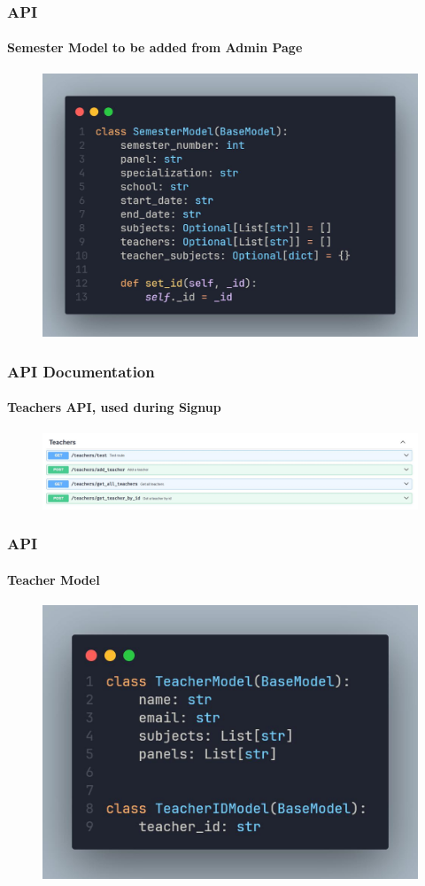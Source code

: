 \documentclass[aspectratio=169]{beamer}
\begin{document}
\begin{frame}
	\centering
	\frametitle{API}
	\framesubtitle{Semester Model to be added from Admin Page}
	\begin{minipage}{0.95\textwidth}
		\begin{figure}[H]
			\centering
			\includegraphics[width=.65\textwidth]{semester.jpg}
		\end{figure}
	\end{minipage}
\end{frame}

\begin{frame}
	\centering
	\frametitle{API Documentation}
	\framesubtitle{Teachers API, used during Signup}
	\begin{minipage}{0.95\textwidth}
		\begin{figure}[H]
			\centering
			\includegraphics[width=.95\textwidth]{swagger 7.jpg}
		\end{figure}
	\end{minipage}
\end{frame}


\begin{frame}
	\centering
	\frametitle{API}
	\framesubtitle{Teacher Model}
	\begin{minipage}{0.95\textwidth}
		\begin{figure}[H]
			\centering
			\includegraphics[width=.75\textwidth]{teacher.jpg}
		\end{figure}
	\end{minipage}
\end{frame}
\end{document}
